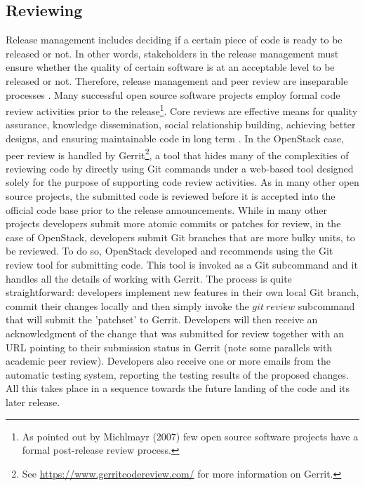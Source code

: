 \documentclass[dvipsnames]{bmcart}
\theoremstyle{definition}
\begin{document}
\subsection{Reviewing} 

Release management includes deciding if a certain piece of code is ready to be released or not. In other words, stakeholders in the release management must ensure whether the quality of certain software is at an acceptable level to be released or not. Therefore, release management and peer review are inseparable processes 
\cite[]{jorgensen2001putting,sharma_et_al2002framework,narayan2012leveraging,stark1999examination}. Many successful open source software projects employ formal code review activities prior to the release\footnote{As pointed out by Michlmayr (2007) \cite{Michlmayr_et_al2007} few open source software projects have a formal post-release review process.}. Core reviews are effective means for quality assurance, knowledge dissemination, social relationship building, achieving better designs, and ensuring maintainable code in long term \cite{bosu_et_al2017process}. In the OpenStack case, peer review is handled by Gerrit\footnote{See \url {https://www.gerritcodereview.com/} for more information on Gerrit.}, a tool that hides many of the complexities of reviewing code by directly using Git commands under a web-based tool designed solely for the purpose of supporting code review activities.  As in many other open source projects, the submitted code is reviewed before it is accepted into the official code base prior to the release announcements. While in many other projects developers submit more atomic commits or patches for review, in the case of  OpenStack, developers submit Git branches that are more bulky units, to be reviewed. To do so, OpenStack developed and recommends using the Git review tool for submitting code. This tool is invoked as a Git subcommand and it handles all the details of working with Gerrit. The process is quite straightforward: developers implement new features in their own local Git branch, commit their changes locally and then simply invoke the $git\ review$ subcommand that will submit the 'patchset' to Gerrit. Developers will then receive an acknowledgment of the change that was submitted for review together with an URL pointing to their submission status in Gerrit (note some parallels with academic peer review). Developers also receive one or more emails from the automatic testing system, reporting the testing results of the proposed changes. All this takes place in a sequence towards the future landing of the code and its later release. 
\end{document}
